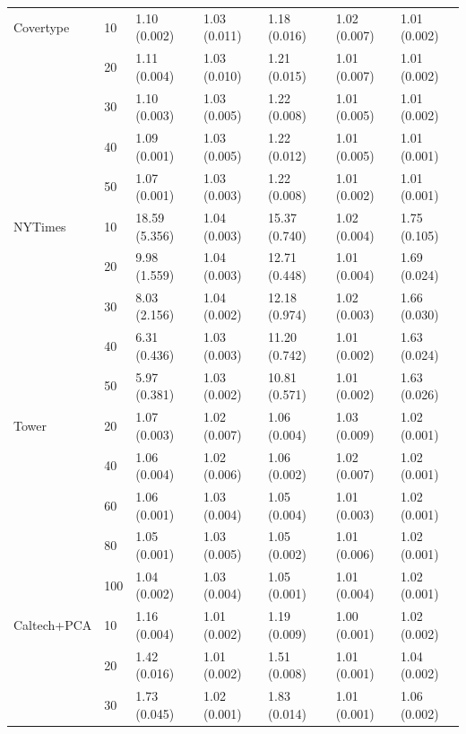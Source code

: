 \begin{longtable}{p{}llllll}
\midrule
Covertype & 10  &   1.10 (0.002) &   1.03 (0.011) &   1.18 (0.016) &         1.02 (0.007) &  1.01 (0.002) \\
      & 20  &   1.11 (0.004) &   1.03 (0.010) &   1.21 (0.015) &         1.01 (0.007) &  1.01 (0.002) \\
      & 30  &   1.10 (0.003) &   1.03 (0.005) &   1.22 (0.008) &         1.01 (0.005) &  1.01 (0.002) \\
      & 40  &   1.09 (0.001) &   1.03 (0.005) &   1.22 (0.012) &         1.01 (0.005) &  1.01 (0.001) \\
      & 50  &   1.07 (0.001) &   1.03 (0.003) &   1.22 (0.008) &         1.01 (0.002) &  1.01 (0.001) \\
\midrule
NYTimes & 10  &  18.59 (5.356) &   1.04 (0.003) &  15.37 (0.740) &         1.02 (0.004) &  1.75 (0.105) \\
      & 20  &   9.98 (1.559) &   1.04 (0.003) &  12.71 (0.448) &         1.01 (0.004) &  1.69 (0.024) \\
      & 30  &   8.03 (2.156) &   1.04 (0.002) &  12.18 (0.974) &         1.02 (0.003) &  1.66 (0.030) \\
      & 40  &   6.31 (0.436) &   1.03 (0.003) &  11.20 (0.742) &         1.01 (0.002) &  1.63 (0.024) \\
      & 50  &   5.97 (0.381) &   1.03 (0.002) &  10.81 (0.571) &         1.01 (0.002) &  1.63 (0.026) \\
\midrule
Tower & 20  &   1.07 (0.003) &   1.02 (0.007) &   1.06 (0.004) &         1.03 (0.009) &  1.02 (0.001) \\
      & 40  &   1.06 (0.004) &   1.02 (0.006) &   1.06 (0.002) &         1.02 (0.007) &  1.02 (0.001) \\
      & 60  &   1.06 (0.001) &   1.03 (0.004) &   1.05 (0.004) &         1.01 (0.003) &  1.02 (0.001) \\
      & 80  &   1.05 (0.001) &   1.03 (0.005) &   1.05 (0.002) &         1.01 (0.006) &  1.02 (0.001) \\
      & 100 &   1.04 (0.002) &   1.03 (0.004) &   1.05 (0.001) &         1.01 (0.004) &  1.02 (0.001) \\
\midrule
Caltech+PCA & 10  &   1.16 (0.004) &   1.01 (0.002) &   1.19 (0.009) &         1.00 (0.001) &  1.02 (0.002) \\
      & 20  &   1.42 (0.016) &   1.01 (0.002) &   1.51 (0.008) &         1.01 (0.001) &  1.04 (0.002) \\
      & 30  &   1.73 (0.045) &   1.02 (0.001) &   1.83 (0.014) &         1.01 (0.001) &  1.06 (0.002) \\

\end{longtable}
